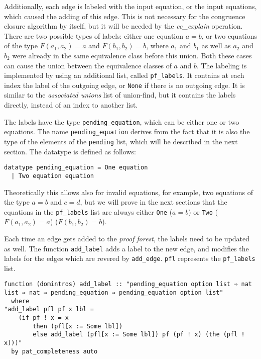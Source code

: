 Additionally, each edge is labeled with the input equation, or the input equations, which caused the adding of this edge. This is not necessary for the congruence closure algorithm by itself, but it will be needed by the \emph{cc\_explain} operation.
There are two possible types of labels: either one equation $a = b$, or two equations of the type $F(a_1, a_2) = a$ and $F(b_1, b_2) = b$, where $a_1$ and $b_1$ as well as $a_2$ and $b_2$ were already in the same equivalence class before this union.
Both these cases can cause the union between the equivalence classes of $a$ and $b$.
The labeling is implemented by using an additional list, called \lstinline|pf_labels|.
It contains at each index the label of the outgoing edge, or \lstinline|None| if there is no outgoing edge.
It is similar to the \emph{associated unions} list of union-find, but it contains the labels directly, instead of an index to another list.

The labels have the type \lstinline|pending_equation|, which can be either one or two equations. The name \lstinline|pending_equation| derives from the fact that it is also the type of the elements of the \lstinline|pending| list, which will be described in the next section. The datatype is defined as follows:

\begin{lstlisting}
datatype pending_equation = One equation
  | Two equation equation
\end{lstlisting}

Theoretically this allows also for invalid equations, for example, two equations of the type $a = b$ and $c = d$, but we will prove in the next sections that the equations in the \lstinline|pf_labels| list are always either \lstinline{One} ($a = b$) or \lstinline{Two} ($F(a_1, a_2) = a$) ($F(b_1, b_2) = b$).

Each time an edge gets added to the \emph{proof forest}, the labels need to be updated as well. The function \lstinline{add_label} adds a label to the new edge, and modifies the labels for the edges which are revered by \lstinline{add_edge}. \lstinline|pfl| represents the \lstinline|pf_labels| list.

\begin{lstlisting}
function (domintros) add_label :: "pending_equation option list ⇒ nat list ⇒ nat ⇒ pending_equation ⇒ pending_equation option list"
  where
"add_label pfl pf x lbl =
    (if pf ! x = x
        then (pfl[x := Some lbl])
        else add_label (pfl[x := Some lbl]) pf (pf ! x) (the (pfl ! x)))"
  by pat_completeness auto
\end{lstlisting}

